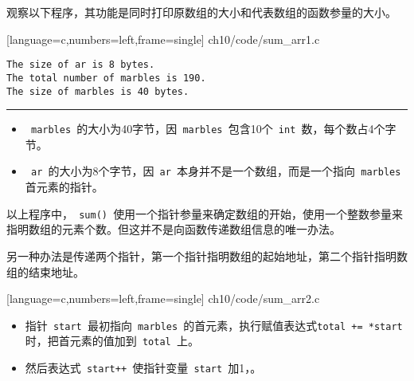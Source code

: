 \begin{frame}[fragile]\ft{\secname}
观察以下程序，其功能是同时打印原数组的大小和代表数组的函数参量的大小。
\end{frame}

\begin{frame}\ft{\secname}

[language=c,numbers=left,frame=single]
{ch10/code/sum_arr1.c}
\end{frame}


\begin{frame}[fragile]\ft{\secname}
\begin{lstlisting}[backgroundcolor=\color{red!20}]
The size of ar is 8 bytes.
The total number of marbles is 190.
The size of marbles is 40 bytes.
\end{lstlisting}
\rule{\textwidth}{0.2mm} \pause 

\begin{itemize}
\item \lstinline| marbles |的大小为40字节，因\lstinline| marbles |包含10个\lstinline| int |数，每个数占4个字节。
\item \lstinline| ar |的大小为8个字节，因\lstinline| ar |本身并不是一个数组，而是一个指向\lstinline| marbles |首元素的指针。
\end{itemize}
\end{frame}

\begin{frame}[fragile]
以上程序中，\lstinline| sum() |使用一个指针参量来确定数组的开始，使用一个整数参量来指明数组的元素个数。但这并不是向函数传递数组信息的唯一办法。
\end{frame}

\begin{frame}[fragile]
另一种办法是传递两个指针，第一个指针指明数组的起始地址，第二个指针指明数组的结束地址。
\end{frame}

\begin{frame}

[language=c,numbers=left,frame=single]
{ch10/code/sum_arr2.c}
\end{frame}


\begin{frame}[fragile]
\begin{itemize}
\item 指针\lstinline| start |最初指向\lstinline| marbles |的首元素，执行赋值表达式\lstinline|total += *start|时，把首元素的值加到\lstinline| total |上。\\[0.1in]
\item 然后表达式\lstinline| start++ |使指针变量\lstinline| start |加1，。
\end{itemize}
\end{frame}

